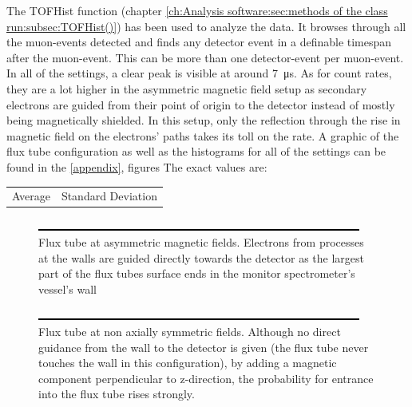   	
  The TOFHist function (chapter \ref{ch:Analysis software:sec:methods of the class run:subsec:TOFHist()}) has been used to analyze the data.
  It browses through all the muon-events detected and finds any detector event in a definable timespan after the muon-event. This can be more than one detector-event per  muon-event. In all of the settings, a clear peak is visible at around \SI{7}{\micro\second}. As for count rates, they are a lot higher in the asymmetric magnetic field setup as secondary electrons are guided from their point of origin to the detector instead of mostly being magnetically shielded. In this setup, only the reflection through the rise in magnetic field on the electrons' paths takes its toll on the rate.
  A graphic of the flux tube configuration as well as the histograms for all of the settings can be found in the \ref{appendix}, figures 
  The exact values are:
  \begin{table}
  	\begin{tabularx}{0.8\textwidth}{>{\centering}X>{\centering\arraybackslash}X}
  		Average & Standard Deviation\\
  	\end{tabularx}
  \end{table}

  
  
  \begin{figure}
	\includegraphics{graphics/dummy.eps}
	\caption[Asymmetric magnetic field flux tube]{Flux tube at asymmetric magnetic fields. Electrons from processes at the walls are guided directly towards the detector as the largest part of the flux tubes surface ends in the monitor spectrometer's vessel's wall}
  	\label{fig:monSpec:asymmetric magnetic field}
  \end{figure}

    \begin{figure}
	
	\includegraphics{graphics/dummy.eps}
  	\caption[Non-axially symmetric magnetic flux tube]{Flux tube at non axially symmetric fields. Although no direct guidance from the wall to the detector is given (the flux tube never touches the wall in this configuration), by adding a magnetic component perpendicular to z-direction, the probability for entrance into the flux tube rises strongly.}
  	\label{fig:monSpec:non axially symmetric magnetic field}
  \end{figure}
  
